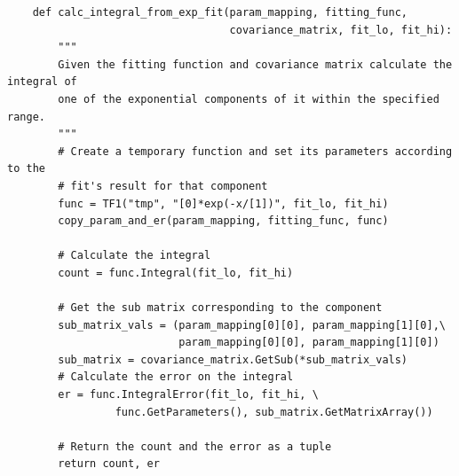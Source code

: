 \documentclass[]{article}
\begin{document}
\begin{verbatim}
    def calc_integral_from_exp_fit(param_mapping, fitting_func,
                                   covariance_matrix, fit_lo, fit_hi):
        """
        Given the fitting function and covariance matrix calculate the integral of 
        one of the exponential components of it within the specified range.
        """
        # Create a temporary function and set its parameters according to the 
        # fit's result for that component
        func = TF1("tmp", "[0]*exp(-x/[1])", fit_lo, fit_hi)
        copy_param_and_er(param_mapping, fitting_func, func)
        
        # Calculate the integral
        count = func.Integral(fit_lo, fit_hi)

        # Get the sub matrix corresponding to the component 
        sub_matrix_vals = (param_mapping[0][0], param_mapping[1][0],\
                           param_mapping[0][0], param_mapping[1][0])
        sub_matrix = covariance_matrix.GetSub(*sub_matrix_vals)
        # Calculate the error on the integral
        er = func.IntegralError(fit_lo, fit_hi, \
                 func.GetParameters(), sub_matrix.GetMatrixArray())
                 
        # Return the count and the error as a tuple
        return count, er
\end{verbatim}


\end{document}
